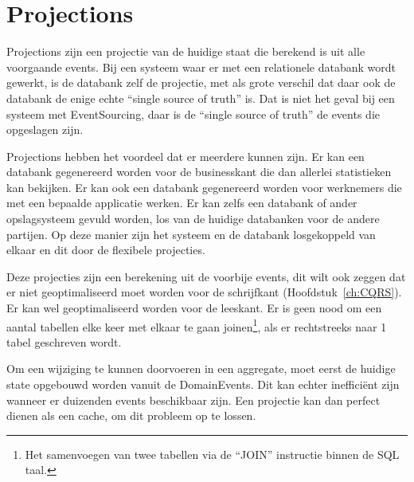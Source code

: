 
\section{Projections}
\label{sec:projections}

Projections zijn een projectie van de huidige staat die berekend is uit alle voorgaande events. Bij een systeem waar er met een relationele databank wordt gewerkt, is de databank zelf de projectie, met als grote verschil dat daar ook de databank de enige echte ``single source of truth'' is. Dat is niet het geval bij een systeem met EventSourcing, daar is de ``single source of truth'' de events die opgeslagen zijn.

Projections hebben het voordeel dat er meerdere kunnen zijn. Er kan een databank gegenereerd worden voor de businesskant die dan allerlei statistieken kan bekijken. Er kan ook een databank gegenereerd worden voor werknemers die met een bepaalde applicatie werken. Er kan zelfs een databank of ander opslagsysteem gevuld worden, los van de huidige databanken voor de andere partijen. Op deze manier zijn het systeem en de databank losgekoppeld van elkaar en dit door de flexibele projecties. 

Deze projecties zijn een berekening uit de voorbije events, dit wilt ook zeggen dat er niet geoptimaliseerd moet worden voor de schrijfkant (Hoofdstuk~\ref{ch:CQRS}). Er kan wel geoptimaliseerd worden voor de leeskant. Er is geen nood om een aantal tabellen elke keer met elkaar te gaan joinen\footnote{Het samenvoegen van twee tabellen via de ``JOIN'' instructie binnen de \gls{SQL} taal.}, als er rechtstreeks naar 1 tabel geschreven wordt.

Om een wijziging te kunnen doorvoeren in een aggregate, moet eerst de huidige state opgebouwd worden vanuit de DomainEvents. Dit kan echter inefficiënt zijn wanneer er duizenden events beschikbaar zijn. Een projectie kan dan perfect dienen als een \gls{cache}, om dit probleem op te lossen.